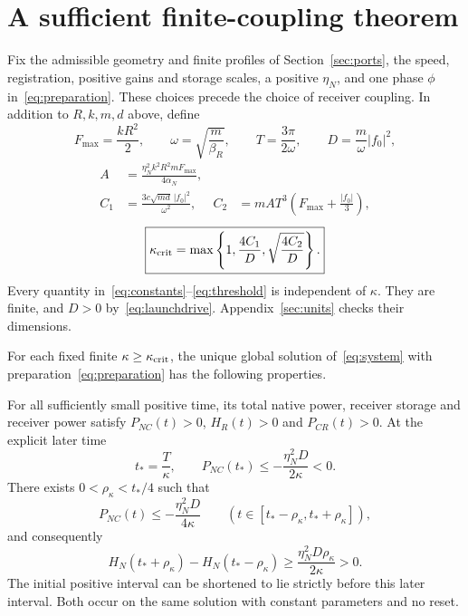 \section{A sufficient finite-coupling theorem}\label{sec:theorem}
Fix the admissible geometry and finite profiles of Section~\ref{sec:ports}, the speed, registration, positive gains and storage scales, a positive $\eta_N$, and one phase $\phi$ in~\eqref{eq:preparation}. These choices precede the choice of receiver coupling. In addition to $R,k,m,d$ above, define
\begin{equation}\label{eq:constants}
F_{\max}=\frac{kR^2}{2},\qquad
\omega=\sqrt{\frac m{\beta_R}},\qquad
T=\frac{3\pi}{2\omega},\qquad
D=\frac m\omega|f_0|^2,
\end{equation}
\begin{equation}\label{eq:errorconstants}
\begin{aligned}
A&=\frac{\eta_N^2k^2R^2mF_{\max}}{4\alpha_N},\\
C_1&=\frac{3c\sqrt{md}\,|f_0|^2}{\omega^2},&
C_2&=mAT^3\left(F_{\max}+\frac{|f_0|}{3}\right),
\end{aligned}
\end{equation}
\begin{equation}\label{eq:threshold}
\boxed{\kappa_{\rm crit}
=\max\left\{1,\frac{4C_1}{D},\sqrt{\frac{4C_2}{D}}\right\}.}
\end{equation}
Every quantity in~\eqref{eq:constants}--\eqref{eq:threshold} is independent of $\kappa$. They are finite, and $D>0$ by~\eqref{eq:launchdrive}. Appendix~\ref{sec:units} checks their dimensions.

\begin{theorem}\label{thm:credit}
For each fixed finite $\kappa\ge\kappa_{\rm crit}$, the unique global solution of~\eqref{eq:system} with preparation~\eqref{eq:preparation} has the following properties.

For all sufficiently small positive time, its total native power, receiver storage and receiver power satisfy
$P_{NC}(t)>0$, $H_R(t)>0$ and $P_{CR}(t)>0$.
At the explicit later time
\begin{equation}\label{eq:witness}
t_*=\frac T\kappa,\qquad
P_{NC}(t_*)\le-\frac{\eta_N^2D}{2\kappa}<0.
\end{equation}
There exists $0<\rho_\kappa<t_*/4$ such that
\begin{equation}\label{eq:interval}
P_{NC}(t)\le-\frac{\eta_N^2D}{4\kappa}
\qquad(t\in[t_*-\rho_\kappa,t_*+\rho_\kappa]),
\end{equation}
and consequently
\begin{equation}\label{eq:gain}
H_N(t_*+\rho_\kappa)-H_N(t_*-\rho_\kappa)
\ge\frac{\eta_N^2D\rho_\kappa}{2\kappa}>0.
\end{equation}
The initial positive interval can be shortened to lie strictly before this later interval. Both occur on the same solution with constant parameters and no reset.
\end{theorem}

